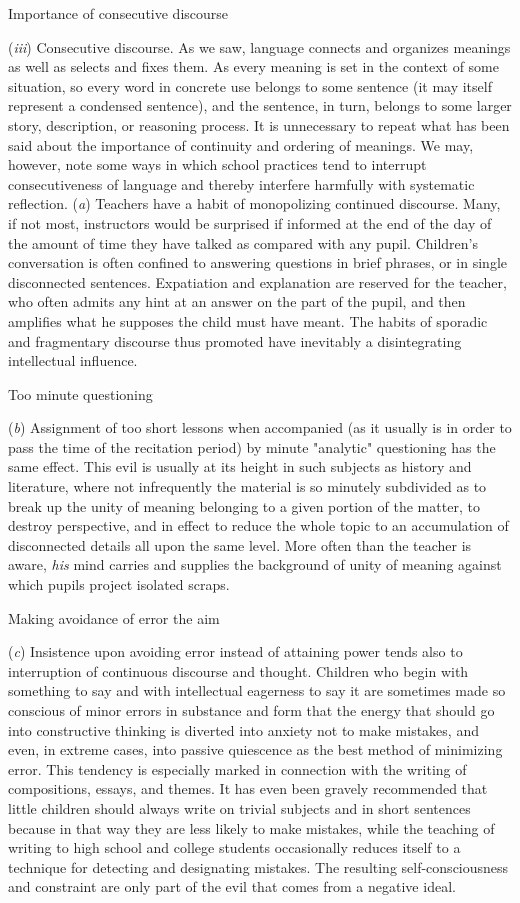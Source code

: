 \documentclass[letterpaper]{book}
\begin{document}
Importance of consecutive discourse

(\emph{iii}) Consecutive discourse. As we saw, language connects and
organizes meanings as well as selects and fixes them. As every meaning
is set in the context of some situation, so every word in concrete use
belongs to some sentence (it may itself represent a condensed sentence),
and the sentence, in turn, belongs to some larger story, description, or
reasoning process. It is unnecessary to repeat what has been said about
the importance of continuity and ordering of meanings. We may, however,
note some ways in which school practices tend to interrupt
consecutiveness of language and thereby interfere harmfully with
systematic reflection. (\emph{a}) Teachers have a habit of monopolizing
continued discourse. Many, if not most, instructors would be surprised
if informed at the end of the day of the amount of time they have talked
as compared with any pupil. Children's conversation is often confined to
answering questions in brief phrases, or in single disconnected
sentences.
Expatiation
and explanation are reserved for the teacher, who often admits any hint
at an answer on the part of the pupil, and then amplifies what he
supposes the child must have meant. The habits of sporadic and
fragmentary discourse thus promoted have inevitably a disintegrating
intellectual influence.

Too minute questioning

(\emph{b}) Assignment of too short lessons when accompanied (as it
usually is in order to pass the time of the recitation period) by minute
"analytic" questioning has the same effect. This evil is usually at its
height in such subjects as history and literature, where not
infrequently the material is so minutely subdivided as to break up the
unity of meaning belonging to a given portion of the matter, to destroy
perspective, and in effect to reduce the whole topic to an accumulation
of disconnected details all upon the same level. More often than the
teacher is aware, \emph{his} mind carries and supplies the background of
unity of meaning against which pupils project isolated scraps.

Making avoidance of error the aim

(\emph{c}) Insistence upon avoiding error instead of attaining power
tends also to interruption of continuous discourse and thought. Children
who begin with something to say and with intellectual eagerness to say
it are sometimes made so conscious of minor errors in substance and form
that the energy that should go into constructive thinking is diverted
into anxiety not to make mistakes, and even, in extreme cases, into
passive quiescence as the best method of minimizing error. This tendency
is especially marked in connection with the writing of compositions,
essays, and themes. It has even been gravely recommended that little
children should always write on trivial subjects and in short sentences
because in that way they are less likely to make mistakes,
while
the teaching of writing to high school and college students occasionally
reduces itself to a technique for detecting and designating mistakes.
The resulting self-consciousness and constraint are only part of the
evil that comes from a negative
ideal.
\end{document}
